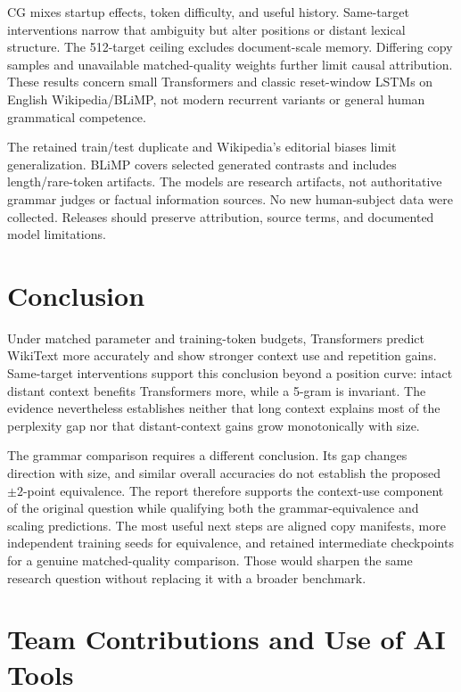 \documentclass[10pt]{article}
\begin{document}
CG mixes startup effects, token difficulty, and useful history. Same-target interventions narrow that ambiguity but alter positions or distant lexical structure. The 512-target ceiling excludes document-scale memory. Differing copy samples and unavailable matched-quality weights further limit causal attribution. These results concern small Transformers and classic reset-window LSTMs on English Wikipedia/BLiMP, not modern recurrent variants or general human grammatical competence.

The retained train/test duplicate and Wikipedia's editorial biases limit generalization. BLiMP covers selected generated contrasts and includes length/rare-token artifacts. The models are research artifacts, not authoritative grammar judges or factual information sources. No new human-subject data were collected. Releases should preserve attribution, source terms, and documented model limitations.

\section{Conclusion}

Under matched parameter and training-token budgets, Transformers predict WikiText more accurately and show stronger context use and repetition gains. Same-target interventions support this conclusion beyond a position curve: intact distant context benefits Transformers more, while a 5-gram is invariant. The evidence nevertheless establishes neither that long context explains most of the perplexity gap nor that distant-context gains grow monotonically with size.

The grammar comparison requires a different conclusion. Its gap changes direction with size, and similar overall accuracies do not establish the proposed $\pm2$-point equivalence. The report therefore supports the context-use component of the original question while qualifying both the grammar-equivalence and scaling predictions. The most useful next steps are aligned copy manifests, more independent training seeds for equivalence, and retained intermediate checkpoints for a genuine matched-quality comparison. Those would sharpen the same research question without replacing it with a broader benchmark.

\section*{Team Contributions and Use of AI Tools}
\end{document}
